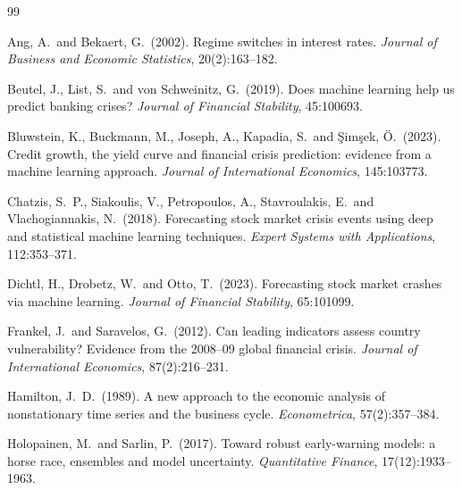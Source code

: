 \documentclass[11pt,a4paper]{article}
\begin{document}
\begin{thebibliography}{99}

Ang, A.\ and Bekaert, G.\ (2002).
\newblock Regime switches in interest rates.
\newblock \emph{Journal of Business and Economic Statistics}, 20(2):163--182.

Beutel, J., List, S.\ and von Schweinitz, G.\ (2019).
\newblock Does machine learning help us predict banking crises?
\newblock \emph{Journal of Financial Stability}, 45:100693.

Bluwstein, K., Buckmann, M., Joseph, A., Kapadia, S.\ and \c{S}im\c{s}ek, \"O.\ (2023).
\newblock Credit growth, the yield curve and financial crisis prediction:
evidence from a machine learning approach.
\newblock \emph{Journal of International Economics}, 145:103773.

Chatzis, S.\ P., Siakoulis, V., Petropoulos, A., Stavroulakis, E.\ and Vlachogiannakis, N.\ (2018).
\newblock Forecasting stock market crisis events using deep and statistical
machine learning techniques.
\newblock \emph{Expert Systems with Applications}, 112:353--371.

Dichtl, H., Drobetz, W.\ and Otto, T.\ (2023).
\newblock Forecasting stock market crashes via machine learning.
\newblock \emph{Journal of Financial Stability}, 65:101099.

Frankel, J.\ and Saravelos, G.\ (2012).
\newblock Can leading indicators assess country vulnerability? Evidence from
the 2008--09 global financial crisis.
\newblock \emph{Journal of International Economics}, 87(2):216--231.

Hamilton, J.\ D.\ (1989).
\newblock A new approach to the economic analysis of nonstationary time
series and the business cycle.
\newblock \emph{Econometrica}, 57(2):357--384.

Holopainen, M.\ and Sarlin, P.\ (2017).
\newblock Toward robust early-warning models: a horse race, ensembles and
model uncertainty.
\newblock \emph{Quantitative Finance}, 17(12):1933--1963.


\end{thebibliography}
\end{document}
